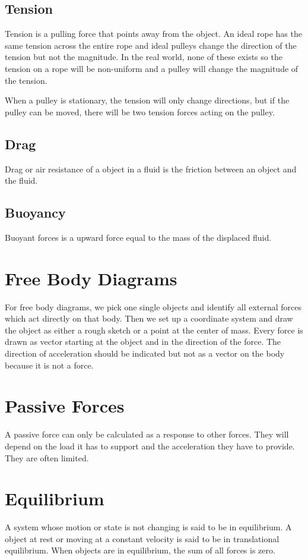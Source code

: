 \documentclass{article}
\theoremstyle{mytheoremstyle}
\theoremstyle{mytheoremstyle}
\theoremstyle{myproblemstyle}
\begin{document}
    \subsection*{Tension}
    Tension is a pulling force that points away from the object. An ideal rope
    has the same tension across the entire rope and ideal pulleys change the
    direction of the tension but not the magnitude. In the real world, none of
    these exists so the tension on a rope will be non-uniform and a pulley will
    change the magnitude of the tension.

    When a pulley is stationary, the tension will only change directions, but if
    the pulley can be moved, there will be two tension forces acting on the
    pulley.

    \subsection*{Drag}
    Drag or air resistance of a object in a fluid is the friction between an
    object and the fluid.

    \subsection*{Buoyancy}
    Buoyant forces is a upward force equal to the mass of the displaced fluid.

    \section*{Free Body Diagrams}
    For free body diagrams, we pick one single objects and identify all external
    forces which act directly on that body. Then we set up a coordinate system
    and draw the object as either a rough sketch or a point at the center of
    mass. Every force is drawn as vector starting at the object and in the
    direction of the force. The direction of acceleration should be indicated
    but not as a vector on the body because it is not a force.


    \section*{Passive Forces}
    A passive force can only be calculated as a response to other forces. They
    will depend on the load it has to support and the acceleration they have to
    provide. They are often limited.

    \section*{Equilibrium}
    A system whose motion or state is not changing is said to be in equilibrium.
    A object at rest or moving at a constant velocity is said to be in
    translational equilibrium. When objects are in equilibrium, the sum of all
    forces is zero.
\end{document}
